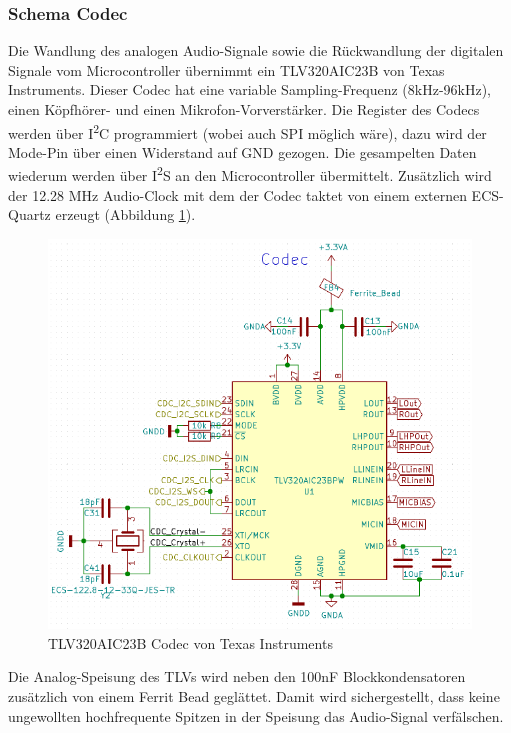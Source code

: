 \subsubsection{Schema Codec}
\label{sec:Schema_Codec}

Die Wandlung des analogen Audio-Signale sowie die Rückwandlung der digitalen Signale vom Microcontroller  übernimmt ein TLV320AIC23B von Texas Instruments. Dieser Codec hat eine variable Sampling-Frequenz (8kHz-96kHz), einen Köpfhörer- und einen Mikrofon-Vorverstärker. Die Register des Codecs werden über I\textsuperscript{2}C programmiert (wobei auch SPI möglich wäre), dazu wird der Mode-Pin über einen Widerstand auf GND gezogen. Die gesampelten Daten wiederum werden über I\textsuperscript{2}S an den Microcontroller übermittelt. Zusätzlich wird der 12.28 \si{MHz} Audio-Clock mit dem der Codec taktet von einem externen ECS-Quartz erzeugt (Abbildung \ref{fig:Schema_Codec}). 

\begin{figure} [H]
\begin{center}
\includegraphics[scale=0.6]{../graphics/Schema_Codec.png}
\caption{TLV320AIC23B Codec von Texas Instruments}
\label{fig:Schema_Codec}
\end{center}
\end{figure}

Die Analog-Speisung des TLVs wird neben den 100\si{nF} Blockkondensatoren zusätzlich von einem Ferrit Bead geglättet. Damit wird sichergestellt, dass keine ungewollten hochfrequente Spitzen in der Speisung das Audio-Signal verfälschen.

